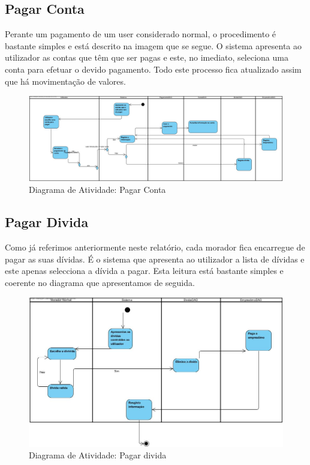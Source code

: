 \newpage
\subsection{Pagar Conta}
Perante um pagamento de um user considerado normal, o procedimento é bastante simples e está descrito na imagem que se segue. 
O sistema apresenta ao utilizador as contas que têm que ser pagas e este, no imediato, seleciona uma conta para efetuar o devido pagamento. Todo este processo fica atualizado assim que há movimentação de valores.

\begin{figure}[htb!]
	\centering
	\includegraphics[scale=0.3]{imagens/diagActividade/PagarContaUserNormal}  
	\caption{Diagrama de Atividade: Pagar Conta}  
\end{figure}


\subsection{Pagar Divida}

Como já referimos anteriormente neste relatório, cada morador fica encarregue de pagar as suas dívidas. É o sistema que apresenta ao utilizador a lista de dívidas e este apenas selecciona a dívida a pagar. Esta leitura está bastante simples e coerente no diagrama que apresentamos de seguida.

\begin{figure}[htb!]
	\centering
	\includegraphics[scale=0.35]{imagens/diagActividade/PagarDivida}  
	\caption{Diagrama de Atividade: Pagar divida}  
\end{figure}



